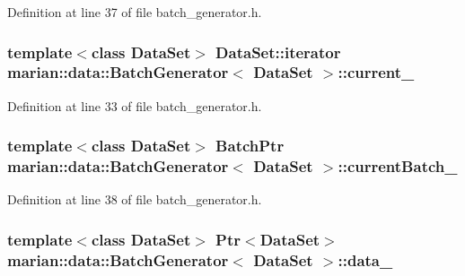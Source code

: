 Definition at line 37 of file batch\+\_\+generator.\+h.

\subsubsection[{\texorpdfstring{current\+\_\+}{current_}}]{\setlength{\rightskip}{0pt plus 5cm}template$<$class Data\+Set$>$ Data\+Set\+::iterator {\bf marian\+::data\+::\+Batch\+Generator}$<$ Data\+Set $>$\+::current\+\_\+\hspace{0.3cm}{\ttfamily [private]}}\hypertarget{classmarian_1_1data_1_1BatchGenerator_ac6a705063c91ae12d09e8d40206c3dcf}{}\label{classmarian_1_1data_1_1BatchGenerator_ac6a705063c91ae12d09e8d40206c3dcf}


Definition at line 33 of file batch\+\_\+generator.\+h.

\subsubsection[{\texorpdfstring{current\+Batch\+\_\+}{currentBatch_}}]{\setlength{\rightskip}{0pt plus 5cm}template$<$class Data\+Set$>$ {\bf Batch\+Ptr} {\bf marian\+::data\+::\+Batch\+Generator}$<$ Data\+Set $>$\+::current\+Batch\+\_\+\hspace{0.3cm}{\ttfamily [private]}}\hypertarget{classmarian_1_1data_1_1BatchGenerator_a95d479771ef65874586e409599043711}{}\label{classmarian_1_1data_1_1BatchGenerator_a95d479771ef65874586e409599043711}


Definition at line 38 of file batch\+\_\+generator.\+h.

\subsubsection[{\texorpdfstring{data\+\_\+}{data_}}]{\setlength{\rightskip}{0pt plus 5cm}template$<$class Data\+Set$>$ {\bf Ptr}$<$Data\+Set$>$ {\bf marian\+::data\+::\+Batch\+Generator}$<$ Data\+Set $>$\+::data\+\_\+\hspace{0.3cm}{\ttfamily [private]}}\hypertarget{classmarian_1_1data_1_1BatchGenerator_a1605c2a706f55cf89272cd19e2f98cf0}{}\label{classmarian_1_1data_1_1BatchGenerator_a1605c2a706f55cf89272cd19e2f98cf0}


